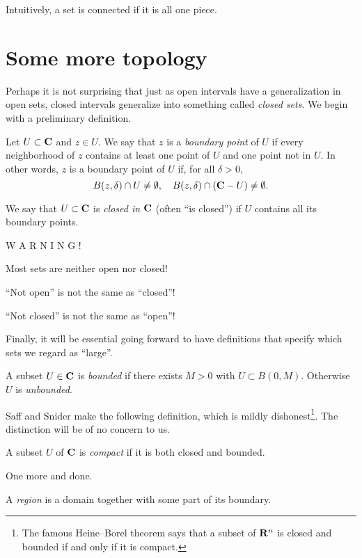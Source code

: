 \documentclass[twocolumn,12pt]{article}
\begin{document}
Intuitively, a set is connected if it is all one piece.
\section{Some more topology}
Perhaps it is not surprising that just as open intervals have a generalization in open sets, closed intervals generalize into something called \emph{closed sets}. We begin with a preliminary definition.
\begin{definition}
    Let $U \subset \mathbf{C}$ and $z \in U$. We say that $z$ is a \emph{boundary point} of $U$ if every neighborhood of $z$ contains at least one point of $U$ and one point not in $U$. In other words, $z$ is a boundary point of $U$ if, for all $\delta > 0$,
    \[
        B(z, \delta) \cap U \ne \emptyset, \quad B(z, \delta) \cap (\mathbf{C} - U) \ne \emptyset.
    \]
\end{definition}
\begin{definition}
    We say that $U \subset \mathbf{C}$ is \emph{closed in $\mathbf{C}$} (often ``is closed'') if $U$ contains all its boundary points.
\end{definition}
\begin{center}
    {\Large W A R N I N G !}

    Most sets are neither open nor closed! 

    ``Not open'' is not the same as ``closed''! 

    ``Not closed'' is not the same as ``open''!
\end{center}
Finally, it will be essential going forward to have definitions that specify which sets we regard as ``large''.
\begin{definition}
    A subset $U \in \mathbf{C}$ is \emph{bounded} if there exists $M > 0$ with $U \subset B(0, M)$. Otherwise $U$ is \emph{unbounded}.
\end{definition}
Saff and Snider make the following definition, which is mildly dishonest\footnote{The famous Heine--Borel theorem says that a subset of $\mathbf{R}^n$ is closed and bounded if and only if it is compact.}. The distinction will be of no concern to us.
\begin{definition}
    A subset $U$ of $\mathbf{C}$ is \emph{compact} if it is both closed and bounded.
\end{definition}
One more and done.
\begin{definition}
    A \emph{region} is a domain together with some part of its boundary.
\end{definition}
\end{document}
